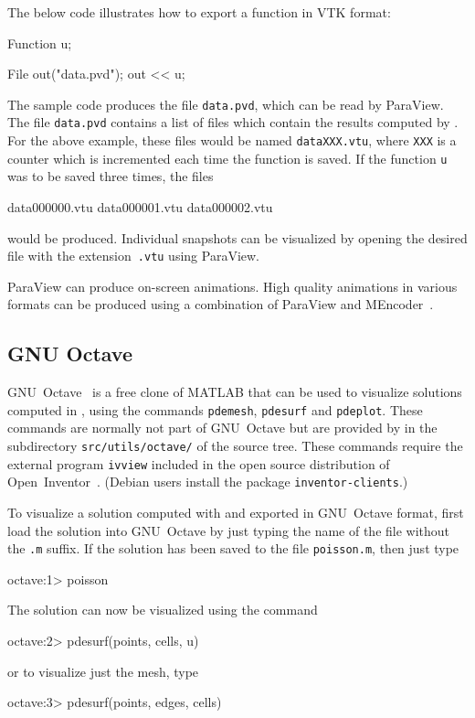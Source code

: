 The below code illustrates how to export a function in VTK format:
\begin{code}
Function u;

File out("data.pvd");
out << u;
\end{code}
The sample code produces the file \texttt{data.pvd}, which can be read 
by ParaView. The file \texttt{data.pvd} contains a list of files which 
contain the results computed by \dolfin{}. For the above example, these 
files would be named \texttt{dataXXX.vtu}, where \texttt{XXX} is a counter 
which is incremented each time the function is saved. If the function 
\texttt{u} was to be saved three times, the files
\begin{code}
data000000.vtu
data000001.vtu
data000002.vtu
\end{code}
would be produced. Individual snapshots can be visualized by opening the 
desired file with the extension~\texttt{.vtu} using ParaView.

ParaView can produce on-screen animations. High quality animations 
in various formats can be produced using a combination of ParaView and 
MEncoder~\cite{www:MEncoder}.


\subsection{GNU Octave}

GNU~Octave~\cite{www:Octave} is a free clone of MATLAB that can be
used to visualize solutions computed in \dolfin{}, using the commands
\texttt{pdemesh}, \texttt{pdesurf} and \texttt{pdeplot}. These
commands are normally not part of GNU~Octave but are
provided by \dolfin{} in the subdirectory \texttt{src/utils/octave/} of
the \dolfin{} source tree. These commands require the external program
\texttt{ivview} included in the open source distribution of
Open~Inventor~\cite{www:OpenInventor}. (Debian users install the
package \texttt{inventor-clients}.)

To visualize a solution computed with \dolfin{} and exported in
GNU~Octave format, first load the solution into GNU~Octave by just
typing the name of the file without the \texttt{.m} suffix. If the
solution has been saved to the file \texttt{poisson.m}, then just type
\begin{code}
octave:1> poisson
\end{code}
The solution can now be visualized using the command
\begin{code}
octave:2> pdesurf(points, cells, u)
\end{code}
or to visualize just the mesh, type
\begin{code}
octave:3> pdesurf(points, edges, cells)
\end{code}


